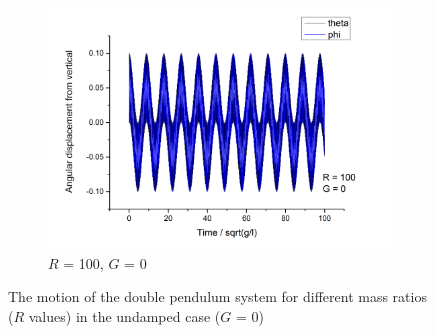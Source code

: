 \documentclass[11pt]{article}
\begin{document}
\begin{figure}[h!]
\begin{subfigure}[h]{0.5\textwidth}
    \includegraphics[width=\textwidth]{img/dp/R=100_G=0.png}
    \captionsetup{width=0.85\textwidth}
    \caption{$R$ = 100, $G$ = 0}
    \label{fig:dp_R1_G0}
  \end{subfigure}
  \caption{The motion of the double pendulum system for different mass ratios ($R$ values) in the undamped case ($G$ = 0)}
  \vspace{-10pt}
\end{figure}
\end{document}
